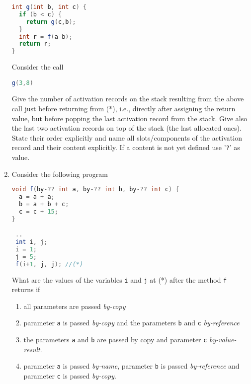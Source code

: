 \documentclass{article}
\begin{document}
\begin{enumerate}
\begin{lstlisting}[language=Java, columns=flexible]
int g(int b, int c) {
  if (b < c) {
    return g(c,b); 
  }
  int r = f(a-b);
  return r;
}
\end{lstlisting}

Consider the call 
\begin{center}
  \lstinline[language=Java, columns=flexible]{g(3,8)} 
\end{center}
Give the number of activation records on the stack resulting from the
above call just before returning from (*), i.e., directly after
assigning the return value, but before popping the last activation
record from the stack. Give also the last two activation records on
top of the stack (the last allocated ones). State their order
explicitly and name all slots/components of the activation record and
their content explicitly. If a content is not yet defined use
'\texttt{?}' as value. 
\item Consider the following program
\begin{lstlisting}[language=Java, columns=flexible] 
void f(by-?? int a, by-?? int b, by-?? int c) {
  a = a + a;
  b = a + b + c;
  c = c + 15;
}

 ..
 int i, j;
 i = 1; 
 j = 5;
 f(i+1, j, j); //(*)
\end{lstlisting}

What are the values of the variables \lstinline!i! and \lstinline!j!
at (*) after the method \lstinline!f! returns if
\begin{enumerate}
  \item all parameters are passed \emph{by-copy}
  \item parameter \lstinline!a! is passed \emph{by-copy} and
    the parameters \lstinline!b! and \lstinline!c! \emph{by-reference}
  \item the parameters \lstinline!a! and \lstinline!b! are passed by
    copy and parameter \lstinline!c! \emph{by-value-result}. 
  \item parameter \lstinline!a! is passed \emph{by-name}, parameter
    \lstinline!b! is passed \emph{by-reference} and parameter
    \lstinline!c! is passed \emph{by-copy}.
\end{enumerate} 
\end{enumerate}
\end{document}
